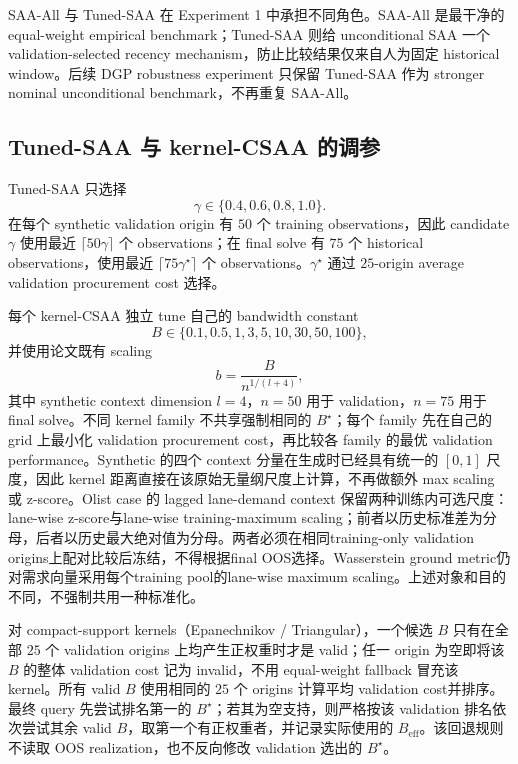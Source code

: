 \documentclass[11pt,a4paper]{ctexart}
\begin{document}
SAA-All 与 Tuned-SAA 在 Experiment 1 中承担不同角色。SAA-All 是最干净的 equal-weight empirical benchmark；Tuned-SAA 则给 unconditional SAA 一个 validation-selected recency mechanism，防止比较结果仅来自人为固定 historical window。后续 DGP robustness experiment 只保留 Tuned-SAA 作为 stronger nominal unconditional benchmark，不再重复 SAA-All。

\subsection{Tuned-SAA 与 kernel-CSAA 的调参}

Tuned-SAA 只选择
\[
\gamma\in\{0.4,0.6,0.8,1.0\}.
\]
在每个 synthetic validation origin 有 $50$ 个 training observations，因此 candidate $\gamma$ 使用最近 $\lceil50\gamma\rceil$ 个 observations；在 final solve 有 $75$ 个 historical observations，使用最近 $\lceil75\gamma^\star\rceil$ 个 observations。$\gamma^\star$ 通过 $25$-origin average validation procurement cost 选择。

每个 kernel-CSAA 独立 tune 自己的 bandwidth constant
\[
B\in\{0.1,0.5,1,3,5,10,30,50,100\},
\]
并使用论文既有 scaling
\[
b=\frac{B}{n^{1/(l+4)}},
\]
其中 synthetic context dimension $l=4$，$n=50$ 用于 validation，$n=75$ 用于 final solve。不同 kernel family 不共享强制相同的 $B^\star$；每个 family 先在自己的 grid 上最小化 validation procurement cost，再比较各 family 的最优 validation performance。Synthetic 的四个 context 分量在生成时已经具有统一的 $[0,1]$ 尺度，因此 kernel 距离直接在该原始无量纲尺度上计算，不再做额外 max scaling 或 z-score。Olist case 的 lagged lane-demand context 保留两种训练内可选尺度：lane-wise z-score与lane-wise training-maximum scaling；前者以历史标准差为分母，后者以历史最大绝对值为分母。两者必须在相同training-only validation origins上配对比较后冻结，不得根据final OOS选择。Wasserstein ground metric仍对需求向量采用每个training pool的lane-wise maximum scaling。上述对象和目的不同，不强制共用一种标准化。

对 compact-support kernels（Epanechnikov / Triangular），一个候选 $B$ 只有在全部 $25$ 个 validation origins 上均产生正权重时才是 valid；任一 origin 为空即将该 $B$ 的整体 validation cost 记为 invalid，不用 equal-weight fallback 冒充该 kernel。所有 valid $B$ 使用相同的 $25$ 个 origins 计算平均 validation cost并排序。最终 query 先尝试排名第一的 $B^\star$；若其为空支持，则严格按该 validation 排名依次尝试其余 valid $B$，取第一个有正权重者，并记录实际使用的 $B_{\mathrm{eff}}$。该回退规则不读取 OOS realization，也不反向修改 validation 选出的 $B^\star$。
\end{document}
